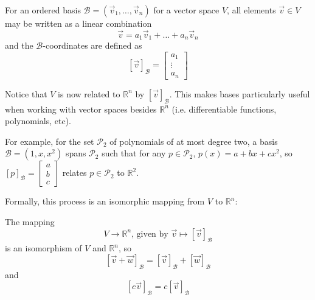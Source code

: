 \begin{shaded}
    For an ordered basis $\mathcal{B} = (\vec{v}_1,\dots,\vec{v}_n)$ for a vector space $V$, all elements $\vec{v}\in V$ may be written as a linear combination \[\vec{v} = a_1\vec{v}_1 + \dots + a_n\vec{v}_n\] and the $\mathcal{B}$-coordinates are defined as \[[\vec{v}]_\mathcal{B} = \begin{bmatrix}
        a_1\\
        \vdots\\
        a_n
    \end{bmatrix}\]
\end{shaded}

Notice that $V$ is now related to $\mathbb{R}^n$ by $[\vec{v}]_\mathcal{B}$. This makes bases particularly useful when working with vector spaces besides $\mathbb{R}^n$ (i.e. differentiable functions, polynomials, etc). 

For example, for the set $\mathcal{P}_2$ of polynomials of at most degree two, a basis $\mathcal{B} = (1, x, x^2)$ spans $\mathcal{P}_2$ such that for any $p\in\mathcal{P}_2$, $p(x) = a + bx + cx^2$, so $[p]_\mathcal{B} = \begin{bmatrix}
    a\\
    b\\
    c
\end{bmatrix}$ relates $p\in\mathcal{P}_2$ to $\mathbb{R}^2$.

Formally, this process is an isomorphic mapping from $V$ to $\mathbb{R}^n$:

\begin{shaded}
The mapping \[V\to\mathbb{R}^n\text{, given by }\vec{v}\mapsto[\vec{v}]_\mathcal{B}\] is an isomorphism of $V$ and $\mathbb{R}^n$, so \[[\vec{v} + \vec{w}]_\mathcal{B} = [\vec{v}]_\mathcal{B} + [\vec{w}]_\mathcal{B}\] and \[[c\vec{v}]_\mathcal{B} = c[\vec{v}]_\mathcal{B}\]
\end{shaded}

